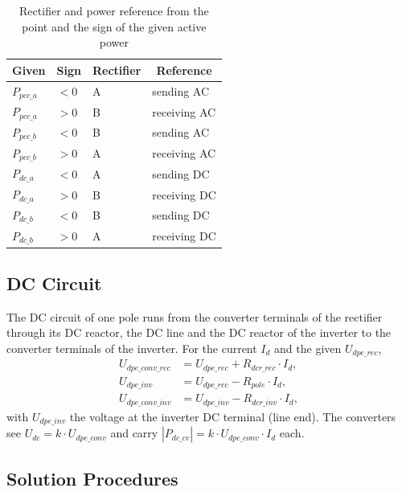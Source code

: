 \begin{table}[!ht]
  \centering
  \small
  \begin{tabular}{@{}l l l l@{}}
    \toprule
    \textbf{Given} & \multicolumn{1}{c}{\textbf{Sign}} & \multicolumn{1}{c}{\textbf{Rectifier}}
      & \multicolumn{1}{c}{\textbf{Reference}} \\
    \midrule
    $P_{pcc\_a}$ & $< 0$ & A & sending AC \\
    $P_{pcc\_a}$ & $> 0$ & B & receiving AC \\
    $P_{pcc\_b}$ & $< 0$ & B & sending AC \\
    $P_{pcc\_b}$ & $> 0$ & A & receiving AC \\
    $P_{dc\_a}$  & $< 0$ & A & sending DC \\
    $P_{dc\_a}$  & $> 0$ & B & receiving DC \\
    $P_{dc\_b}$  & $< 0$ & B & sending DC \\
    $P_{dc\_b}$  & $> 0$ & A & receiving DC \\
    \bottomrule
  \end{tabular}
  \caption{Rectifier and power reference from the point and the sign of the given active power}
  \label{tab:link-reference}
\end{table}

\subsection{DC Circuit}
\label{sec:link-dc}

The DC circuit of one pole runs from the converter terminals of the rectifier through its DC reactor, the DC line
and the DC reactor of the inverter to the converter terminals of the inverter. For the current $I_d$ and the given
$U_{dpe\_rec}$,
\begin{align}
  U_{dpe\_conv\_rec} &= U_{dpe\_rec} + R_{dcr\_rec} \cdot I_d , \\
  U_{dpe\_inv} &= U_{dpe\_rec} - R_{pole} \cdot I_d , \\
  U_{dpe\_conv\_inv} &= U_{dpe\_inv} - R_{dcr\_inv} \cdot I_d ,
\end{align}
with $U_{dpe\_inv}$ the voltage at the inverter DC terminal (line end). The converters see
$U_{dc} = k \cdot U_{dpe\_conv}$ and carry $|P_{dc\_cv}| = k \cdot U_{dpe\_conv} \cdot I_d$ each.

\subsection{Solution Procedures}
\label{sec:link-procedures}

